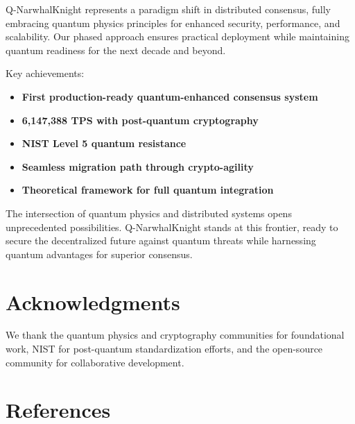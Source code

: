 \documentclass[11pt,a4paper]{article}
\begin{document}
Q-NarwhalKnight represents a paradigm shift in distributed consensus, fully embracing quantum physics principles for enhanced security, performance, and scalability. Our phased approach ensures practical deployment while maintaining quantum readiness for the next decade and beyond.

Key achievements:
\begin{itemize}
    \item \textbf{First production-ready quantum-enhanced consensus system}
    \item \textbf{6,147,388 TPS with post-quantum cryptography}
    \item \textbf{NIST Level 5 quantum resistance}
    \item \textbf{Seamless migration path through crypto-agility}
    \item \textbf{Theoretical framework for full quantum integration}
\end{itemize}

The intersection of quantum physics and distributed systems opens unprecedented possibilities. Q-NarwhalKnight stands at this frontier, ready to secure the decentralized future against quantum threats while harnessing quantum advantages for superior consensus.

\section*{Acknowledgments}

We thank the quantum physics and cryptography communities for foundational work, NIST for post-quantum standardization efforts, and the open-source community for collaborative development.

\section*{References}
\end{document}

